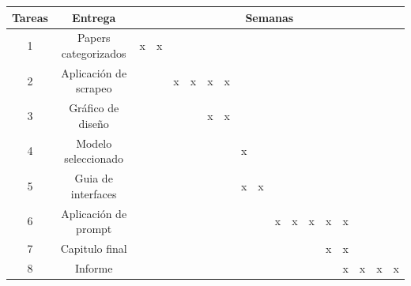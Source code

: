 \documentclass[12pt]{article}
\begin{document}
\begin{table}[h]
\centering
\begin{tabular}{|c|c|c|c|c|c|c|c|c|c|c|c|c|c|c|c|c|c|}
\hline
\textbf{Tareas} & \textbf{Entrega} & \multicolumn{16}{c|}{\textbf{Semanas}} \\
\hline
 1 & Papers categorizados & x & x & & & & & & & & & & & & & &\\
\hline
 2 & Aplicación de scrapeo & & & x & x & x & x & & & & & & & & & & \\
\hline
 3 & Gráfico de diseño & & & & & x & x & & & & & & & & & & \\
\hline
 4 & Modelo seleccionado & & & & & & & x & & & & & & & & & \\
\hline
 5 & Guia de interfaces & & & & & & &x & x & & & & & & & &\\
\hline
 6 & Aplicación de prompt & & & & & & & & &x &x &x &x &x & & & \\
\hline
 7 & Capitulo final & & & & & & & & & & & & x&x & & & \\
\hline
 8 & Informe & & & & & & & & & & & & &x &x &x & x \\
\hline
\end{tabular}
\end{table}




\end{document}

